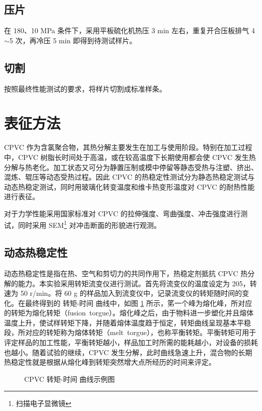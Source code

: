 \subsection{压片}
在 180\cd、10 MPa 条件下，采用平板硫化机热压 3 min 左右，重复开合压板排气 4$\sim$5 次，再冷压 5 min 即得到待测试样片。

\subsection{切割}
按照最终性能测试的要求，将样片切割成标准样条。


\section{表征方法}
CPVC 作为含氯聚合物，其热分解主要发生在加工与使用阶段。特别在加工过程中，CPVC 树脂长时间处于高温，或在较高温度下长期使用都会使 CPVC 发生热分解与热老化。加工状态又可分为静置压制或模中停留等静态受热与注塑、挤出、混炼、辊压等动态受热过程。因此 CPVC 的热稳定性测试分为静态热稳定测试与动态热稳定测试，同时用玻璃化转变温度和维卡热变形温度对 CPVC 的耐热性能进行表征。\par
对于力学性能采用国家标准对 CPVC 的拉伸强度、弯曲强度、冲击强度进行测试，同时采用 SEM\footnote{扫描电子显微镜} 对冲击断面的形貌进行观测。

\subsection{动态热稳定性}\label{sectionHakee}
动态热稳定性是指在热、空气和剪切力的共同作用下，热稳定剂抵抗 CPVC 热分解的能力。本实验采用转矩流变仪进行测试。首先将流变仪的温度设定为 205\cd，转速为 50 r/min。将 60 g 的样品加入到流变仪中，记录流变仪的转矩随时间的变化。在最终得到的 转矩-时间 曲线中，如图 \ref{figExHakee} 所示，笫一个峰为熔化峰，所对应的转矩为熔化转矩（fusion torgue）。熔化峰之后，由于物料进一步塑化并且熔体温度上升，使试样转矩下降，并随着熔体温度趋于恒定，转矩曲线呈现基本平稳段，所对应的转矩称为熔体转矩（melt torgue），也称平衡转矩。平衡转矩可用于评定样品的加工性能，平衡转矩越小，样品加工时所需的能耗越小，对设备的损耗也越小。随着试验的继续，CPVC 发生分解，此时曲线急速上升，混合物的长期热稳定性就是根据从熔化峰到转矩突然增大点所经历的时间来评定。

\begin{figure}[!htbp]
    \begin{center}
        
    \end{center}
    \caption{CPVC 转矩-时间 曲线示例图}
    \label{figExHakee}
\end{figure}

